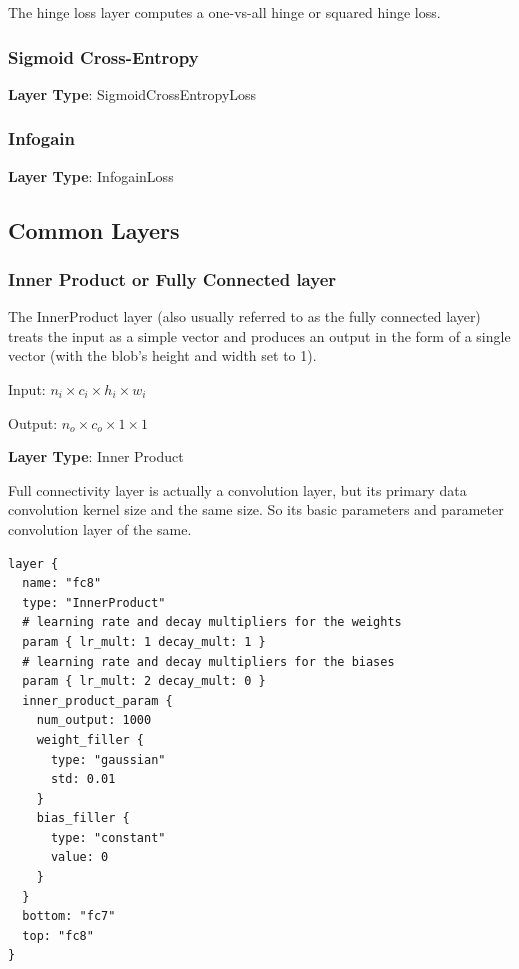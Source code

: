 \documentclass[12pt]{article}
\begin{document}
\noindent The hinge loss layer computes a one-vs-all hinge or squared hinge loss.

\subsubsection{Sigmoid Cross-Entropy}

\noindent \textbf{Layer Type}: SigmoidCrossEntropyLoss

\subsubsection{Infogain}

\noindent \textbf{Layer Type}: InfogainLoss

\newpage

\subsection{Common Layers}

\subsubsection{Inner Product or Fully Connected layer}

The InnerProduct layer (also usually referred to as the fully connected layer) treats the input as a simple vector and produces an output in the form of a single vector (with the blob’s height and width set to 1).

\noindent Input: $n_{i} \times c_{i} \times h_{i}  \times w_{i} $

\noindent Output: $n_{o} \times c_{o} \times 1 \times 1$

\noindent \textbf{Layer Type}: Inner Product

Full connectivity layer is actually a convolution layer, but its primary data convolution kernel size and the same size. So its basic parameters and parameter convolution layer of the same.

\begin{lstlisting}[style=json, frame=single]
layer {
  name: "fc8"
  type: "InnerProduct"
  # learning rate and decay multipliers for the weights
  param { lr_mult: 1 decay_mult: 1 }
  # learning rate and decay multipliers for the biases
  param { lr_mult: 2 decay_mult: 0 }
  inner_product_param {
    num_output: 1000
    weight_filler {
      type: "gaussian"
      std: 0.01
    }
    bias_filler {
      type: "constant"
      value: 0
    }
  }
  bottom: "fc7"
  top: "fc8"
}
\end{lstlisting}
\end{document}
